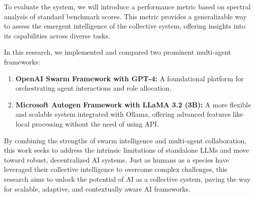 To evaluate the system, we will introduce a performance metric based on spectral analysis of standard benchmark scores. This metric provides a generalizable way to assess the emergent intelligence of the collective system, offering insights into its capabilities across diverse tasks.

In this research, we implemented and compared two prominent multi-agent frameworks:
\begin{enumerate}
  \item \textbf{OpenAI Swarm Framework with GPT-4:} A foundational platform for orchestrating agent interactions and role allocation. \cite{openai}
  \item \textbf{Microsoft Autogen Framework with LLaMA 3.2 (3B):} A more flexible and scalable system integrated with Ollama, offering advanced features like local processing without the need of using API. \cite{microsoft} \cite{autogen_ollama_documentation}
\end{enumerate}

By combining the strengths of swarm intelligence and multi-agent collaboration, this work seeks to address the intrinsic limitations of standalone LLMs and move toward robust, decentralized AI systems. Just as humans as a species have leveraged their collective intelligence to overcome complex challenges, this research aims to unlock the potential of AI as a collective system, paving the way for scalable, adaptive, and contextually aware AI frameworks.
